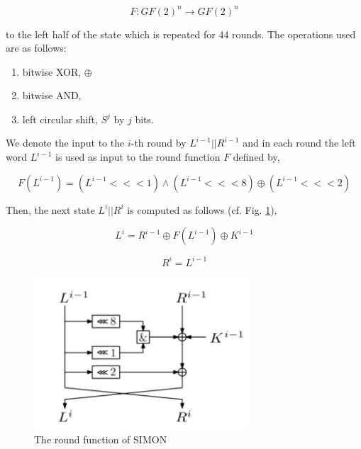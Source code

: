 \begin{equation}
F:GF(2)^n\rightarrow GF(2)^n
\end{equation}

to the left half of the state which is repeated for 44 rounds.
The operations used are as follows:

\begin{enumerate}
	\item bitwise XOR, $\oplus$
	\item bitwise AND,
	\item left circular shift, $S^j$ by $j$ bits.
\end{enumerate}

We denote the input to the $i$-th round by $L^{i-1}||R^{i-1}$
and in each round the left word $L^{i-1}$ is used as input
to the round function $F$ defined by,

\begin{equation}
F(L^{i-1})=(L^{i-1}<<<1)\wedge(L^{i-1}<<<8)\oplus(L^{i-1}<<<2)
\end{equation}

Then, the next state $L^{i}||R^{i}$ is computed as follows
(cf. Fig. \ref{fig:SIMONroundfn}),

\begin{equation}
L^i=R^{i-1}\oplus F(L^{i-1})\oplus K^{i-1}
\end{equation}

\begin{equation}
R^i=L^{i-1}
\end{equation}


\begin{figure}[!h]
	\vspace{-0.2cm}
	\centering
	\includegraphics[width=80mm]{./pics/SIMONroundfn-eps-converted-to.pdf}
	\caption{The round function of SIMON}
	\label{fig:SIMONroundfn}
	\vspace{-0.1cm}
\end{figure}


